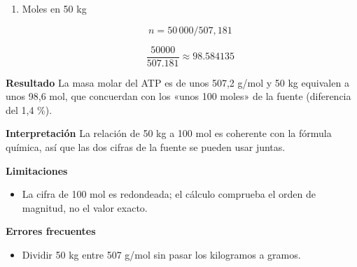 \documentclass{book}
\begin{document}
\begin{tcolorbox}[title={Problema resuelto}, studiumworked, breakable]
\begin{enumerate}
\[
M = 10(12{,}011)+16(1{,}008)+5(14{,}007)+13(15{,}999)+3(30{,}974)
\]

\[
\left(\left(\left(\left(\left(10\cdot 12.011\right)+\left(16\cdot 1.008\right)\right)+\left(5\cdot 14.007\right)\right)+\left(13\cdot 15.999\right)\right)+\left(3\cdot 30.974\right)\right) \approx 507.182
\]
\item
Moles en 50 kg


\[
n = 50\,000 / 507{,}181
\]

\[
\frac{50000}{507.181} \approx 98.584135
\]
\end{enumerate}

\noindent\textbf{Resultado}
La masa molar del ATP es de unos 507,2 g/mol y 50 kg equivalen a unos 98,6 mol, que concuerdan con los «unos 100 moles» de la fuente (diferencia del 1,4 \%).


\noindent\textbf{Interpretación}
La relación de 50 kg a 100 mol es coherente con la fórmula química, así que las dos cifras de la fuente se pueden usar juntas.


\noindent\textbf{Limitaciones}
\begin{itemize}
\item La cifra de 100 mol es redondeada; el cálculo comprueba el orden de magnitud, no el valor exacto.
\end{itemize}

\noindent\textbf{Errores frecuentes}
\begin{itemize}
\item Dividir 50 kg entre 507 g/mol sin pasar los kilogramos a gramos.
\end{itemize}
\end{tcolorbox}
\end{document}
